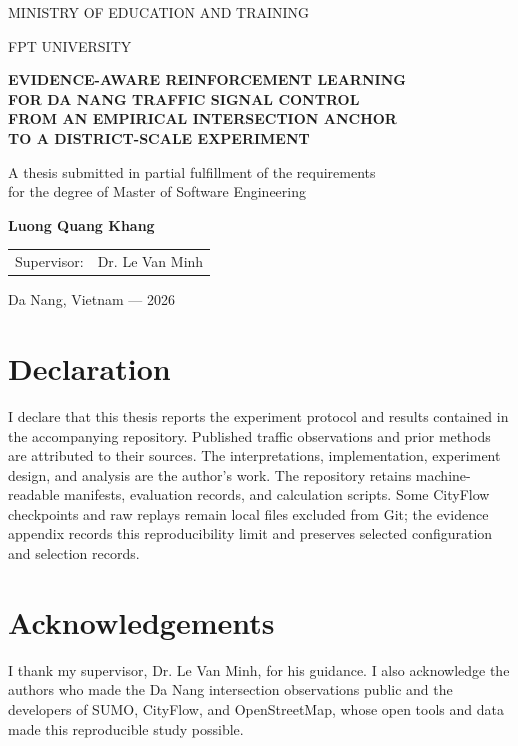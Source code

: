 \documentclass[12pt,a4paper]{report}
\begin{document}
\hypersetup{pageanchor=false}

\begin{titlepage}
\centering
{\large MINISTRY OF EDUCATION AND TRAINING\par}
{\large FPT UNIVERSITY\par}
\vspace{2.2cm}
{\Large\bfseries EVIDENCE-AWARE REINFORCEMENT LEARNING\\[0.25cm]
FOR DA NANG TRAFFIC SIGNAL CONTROL\\[0.25cm]
FROM AN EMPIRICAL INTERSECTION ANCHOR\\[0.25cm]
TO A DISTRICT-SCALE EXPERIMENT\par}
\vspace{1.8cm}
{\large A thesis submitted in partial fulfillment of the requirements\\
for the degree of Master of Software Engineering\par}
\vspace{1.5cm}
{\Large\bfseries Luong Quang Khang\par}
\vfill
\begin{tabular}{ll}
Supervisor: & Dr. Le Van Minh
\end{tabular}
\vfill
{\large Da Nang, Vietnam --- 2026\par}
\end{titlepage}

\hypersetup{pageanchor=true}
\chapter*{Declaration}
I declare that this thesis reports the experiment protocol and results contained in the accompanying repository. Published traffic observations and prior methods are attributed to their sources. The interpretations, implementation, experiment design, and analysis are the author's work. The repository retains machine-readable manifests, evaluation records, and calculation scripts. Some CityFlow checkpoints and raw replays remain local files excluded from Git; the evidence appendix records this reproducibility limit and preserves selected configuration and selection records.

\chapter*{Acknowledgements}
I thank my supervisor, Dr. Le Van Minh, for his guidance. I also acknowledge the authors who made the Da Nang intersection observations public and the developers of SUMO, CityFlow, and OpenStreetMap, whose open tools and data made this reproducible study possible.
\end{document}

